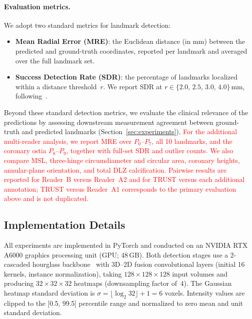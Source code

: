 \documentclass[conference]{IEEEtran}
\begin{document}
\paragraph{Evaluation metrics.}
We adopt two standard metrics for landmark detection:
\begin{itemize}
  \item \textbf{Mean Radial Error (MRE)}: the Euclidean distance (in mm) between the predicted and ground-truth coordinates, reported per landmark and averaged over the full landmark set.
  \item \textbf{Success Detection Rate (SDR)}: the percentage of landmarks localized within a distance threshold~$r$. We report SDR at $r \in \{2.0,\, 2.5,\, 3.0,\, 4.0\}$\,mm, following~\cite{Ma2023_aortic_landmarks}.
\end{itemize}
Beyond these standard detection metrics, we evaluate the clinical relevance of the predictions by assessing downstream measurement agreement between ground-truth and predicted landmarks (Section~\ref{sec:experiments}). \textcolor{red}{For the additional multi-reader analysis, we report MRE over $P_0$--$P_7$, all 10 landmarks, and the coronary ostia $P_8$--$P_9$, together with full-set SDR and outlier counts. We also compare MSL, three-hinge circumdiameter and circular area, coronary heights, annular-plane orientation, and total DLZ calcification. Pairwise results are reported for Reader~B versus Reader~A2 and for TRUST versus each additional annotation; TRUST versus Reader~A1 corresponds to the primary evaluation above and is not duplicated.}

\subsection{Implementation Details}
\label{sec:implementation}

All experiments are implemented in PyTorch and conducted on an NVIDIA RTX A6000 graphics processing unit (GPU; 48\,GB). Both detection stages use a 2-cascaded hourglass backbone~\cite{Newell2016_stacked_hourglass} with 3D--2D fusion convolutional layers (initial 16 kernels, instance normalization), taking $128 \times 128 \times 128$ input volumes and producing $32 \times 32 \times 32$ heatmaps (downsampling factor of~4). The Gaussian heatmap standard deviation is $\sigma = \lfloor\log_2 32\rfloor + 1 = 6$ voxels. Intensity values are clipped to the [0.5, 99.5] percentile range and normalized to zero mean and unit standard deviation.
\end{document}
